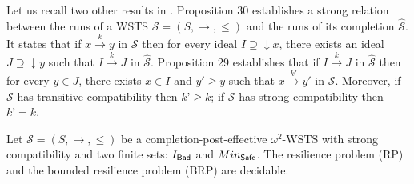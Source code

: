 Let us recall two other results in \cite{BFM-ic17}. Proposition 30 establishes a strong relation between the runs of a WSTS $\mathscr{S}=(S,\rightarrow, \leq)$ and the runs of its completion $\hat{\mathscr{S}}$. It states that if $x \xrightarrow{k} y$ in $\mathscr{S}$ then for every ideal $I \supseteq \downarrow x$, there exists an ideal $J \supseteq \downarrow y$ such that $I \xrightarrow{k} J$ in $\hat{\mathscr{S}}$. Proposition 29 establishes that if $I \xrightarrow{k} J$ in $\hat{\mathscr{S}}$ then for every $y \in J$, there exists $x \in I$ and $y' \geq y$ such that $x \xrightarrow{k'} y'$ in $\mathscr{S}$. Moreover, if $\mathscr{S}$ has transitive compatibility then $k’ \geq k$; if $\mathscr{S}$ has strong compatibility then $k’ = k$.


\begin{theorem}\label{down-up}
Let $\mathscr{S}=(S,\rightarrow, \leq)$ be a completion-post-effective $\omega^2$-WSTS with strong compatibility and two finite sets: $I_{\textsf{Bad}}$ and $Min_{\textsf{Safe}}$.
The resilience problem (RP) and the bounded resilience problem (BRP) are decidable.
\end{theorem}


